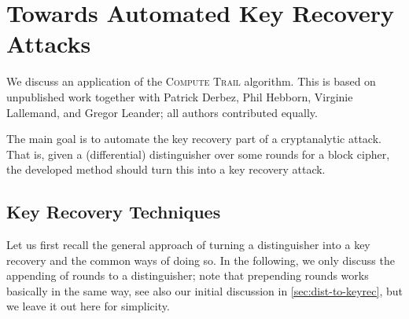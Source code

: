 \chapter{Towards Automated Key Recovery Attacks}\label{ch:key_rec}

\vspace*{-\baselineskip}
\hspace{1.5em}
We discuss an application of the \textsc{Compute Trail} algorithm.
This is based on unpublished work together with Patrick Derbez, Phil Hebborn, Virginie Lallemand, and Gregor Leander; all authors contributed equally.

The main goal is to automate the key recovery part of a cryptanalytic attack.
That is, given a (differential) distinguisher over some rounds for a block cipher, the developed method should turn this into a key recovery attack.

\section{Key Recovery Techniques}
Let us first recall the general approach of turning a distinguisher into a key recovery and the common ways of doing so.
In the following, we only discuss the appending of rounds to a distinguisher; note that prepending rounds works basically in the same way, see also our initial discussion in \cref{sec:dist-to-keyrec}, but we leave it out here for simplicity.

